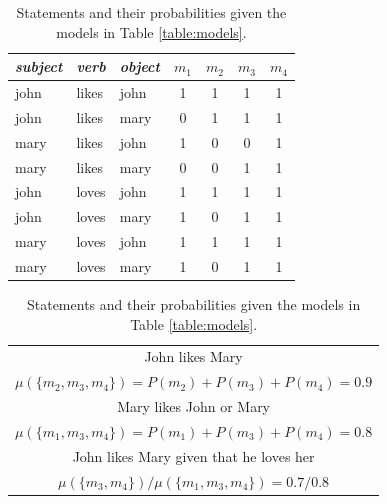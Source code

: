 \documentclass[11pt]{article}
\theoremstyle{definition}
\begin{document}

\begin{table}
  \parbox{.45\linewidth}{
    \centering
    \begin{tabular}{|l|l|l||c|c|c|c|}
      \hline
      \emph{subject} & \emph{verb} & \emph{object} & $m_1$ & $m_2$ & $m_3$ & $m_4$\\
      \hline
      john & likes & john & 1 & 1 & 1 & 1\\
      john & likes & mary & 0 & 1 & 1 & 1\\
      mary & likes & john & 1 & 0 & 0 & 1\\
      mary & likes & mary & 0 & 0 & 1 & 1\\
      john & loves & john & 1 & 1 & 1 & 1\\
      john & loves & mary & 1 & 0 & 1 & 1\\
      mary & loves & john & 1 & 1 & 1 & 1\\
      mary & loves & mary & 1 & 0 & 1 & 1\\
      \hline
    \end{tabular}
    \caption{Four possible models describing relationships between John
      and Mary.}
    \label{table:models}
  }
  \hfill
\parbox{.45\linewidth}{
  \centering
  \def\arraystretch{1.5}%
  \begin{tabular}{c}      
    John likes Mary \\ $\mu(\{m_2, m_3, m_4\}) =
    P(m_2) + P(m_3) + P(m_4) = 0.9$\\
    \hline
    Mary likes John or Mary \\ $\mu(\{m_1, m_3, m_4\}) =
    P(m_1) + P(m_3) + P(m_4) = 0.8$\\
    \hline
    John likes Mary given that he loves her\\
    $\mu(\{m_3, m_4\})/\mu(\{m_1, m_3, m_4\}) = 0.7/0.8$\\
  \end{tabular}
  \caption{Statements and their probabilities given the models in
    Table \ref{table:models}.}
  \label{table:statements}
}
\end{table}
\end{document}
